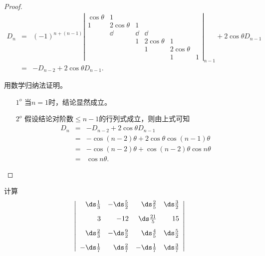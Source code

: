 \begin{proof}
$$
\begin{array}{rcl}
  D_n &=& (-1)^{n+(n-1)} \left|
          \begin{array}{cccccc}
            \cos\theta&1&&&&\\
            1&2\cos\theta&1&&&\\
                      &\dd&\dd&\dd&&\\
                      &&1&2\cos\theta&1&\\
                      &&&1&2\cos\theta&\\
                      &&&&1&1
          \end{array}
                             \right|_{n-1} + 2\cos\theta D_{n-1}\\[0.4in]    
      &=& -  D_{n-2} + 2\cos\theta D_{n-1}.    
\end{array}
$$





用数学归纳法证明。
\begin{itemize}
\item[$1^o$] 当$n=1$时，结论显然成立。
\item[$2^o$] 假设结论对阶数$\le n-1$的行列式成立，则由上式可知
  $$
  \begin{array}{rcl}
    D_n &=& -D_{n-2} + 2\cos\theta D_{n-1} \\[0.2cm]
        &=& -\cos (n-2)\theta + 2\cos\theta\cos(n-1)\theta\\[0.2cm]
        &=& -\cos (n-2)\theta + \cos (n-2)\theta \cos n \theta\\[0.2cm]
        &=& \cos n\theta.
  \end{array}      
  $$
\end{itemize}

\end{proof}



\begin{li}
  计算
  $$
  \left|
    \begin{array}{rrrr}
      \ds \frac13 & -\ds \frac52 & \ds \frac25 & \ds \frac32\\[0.3cm]
      3&-12&\ds \frac{21}5&15\\[0.3cm]
      \ds \frac23&-\ds \frac92&\ds \frac45&\ds \frac52\\[0.3cm]
      -\ds \frac17&\ds \frac27&-\ds \frac17&\ds \frac37        
    \end{array}
  \right|
  $$
\end{li}

